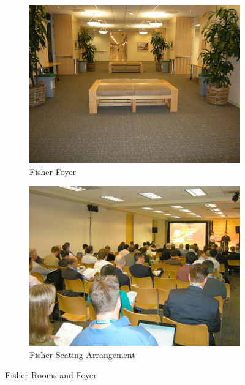 \documentclass[11pt]{article}
\begin{document}
\begin{figure}
\centering
\begin{subfigure}{.5\textwidth}
  \centering
  \includegraphics[width=.9\linewidth]{fig/fisher-foyer}
  \caption{Fisher Foyer}
  \label{fig:fisher-foyer}
\end{subfigure}%
\begin{subfigure}{.5\textwidth}
  \centering
  \includegraphics[width=.9\linewidth]{fig/fisher-class}
  \caption{Fisher Seating Arrangement}
  \label{fig:fisher-seat}
\end{subfigure}
\caption{Fisher Rooms and Foyer}
\label{fig:fisher-class}
\end{figure}
\end{document}
